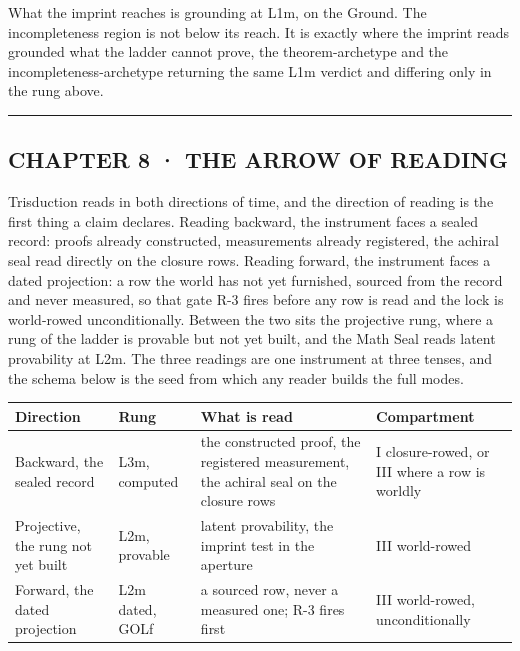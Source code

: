 \documentclass[10pt,twocolumn]{article}
\begin{document}
What the imprint reaches is grounding at L1m, on the Ground. The
incompleteness region is not below its reach. It is exactly where the
imprint reads grounded what the ladder cannot prove, the
theorem-archetype and the incompleteness-archetype returning the same
L1m verdict and differing only in the rung above.

\begin{center}\rule{0.5\linewidth}{0.5pt}\end{center}

\hypertarget{chapter-8-the-arrow-of-reading}{%
\subsection{CHAPTER 8 · THE ARROW OF
READING}\label{chapter-8-the-arrow-of-reading}}

Trisduction reads in both directions of time, and the direction of
reading is the first thing a claim declares. Reading backward, the
instrument faces a sealed record: proofs already constructed,
measurements already registered, the achiral seal read directly on the
closure rows. Reading forward, the instrument faces a dated projection:
a row the world has not yet furnished, sourced from the record and never
measured, so that gate R-3 fires before any row is read and the lock is
world-rowed unconditionally. Between the two sits the projective rung,
where a rung of the ladder is provable but not yet built, and the Math
Seal reads latent provability at L2m. The three readings are one
instrument at three tenses, and the schema below is the seed from which
any reader builds the full modes.

\begin{table}[t]\centering\small
\begin{tabular}{>{\raggedright\arraybackslash}p{}>{\raggedright\arraybackslash}p{}>{\raggedright\arraybackslash}p{}>{\raggedright\arraybackslash}p{}}
\toprule
\textbf{Direction} & \textbf{Rung} & \textbf{What is read} & \textbf{Compartment} \\
\midrule
Backward, the sealed record & L3m, computed & the constructed proof, the registered measurement, the achiral seal on the closure rows & I closure-rowed, or III where a row is worldly \\
Projective, the rung not yet built & L2m, provable & latent provability, the imprint test in the aperture & III world-rowed \\
Forward, the dated projection & L2m dated, GOLf & a sourced row, never a measured one; R-3 fires first & III world-rowed, unconditionally \\
\bottomrule
\end{tabular}
\end{table}
\end{document}
